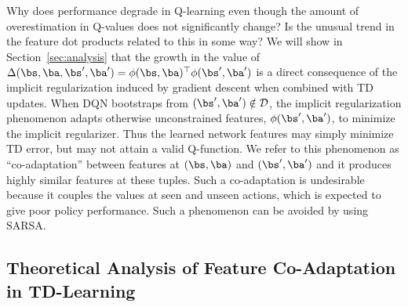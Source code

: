 Why does performance degrade in Q-learning even though the amount of overestimation in Q-values does not significantly change? Is the unusual trend in the feature dot products related to this in some way? We will show in Section~\ref{sec:analysis} that the growth in the value of $\Delta(\bs, \ba, \bs', \ba') = \phi(\bs, \ba)^\top \phi(\bs', \ba')$ is a direct consequence of the implicit regularization induced by gradient descent when combined with TD updates. When DQN bootstraps from $(\bs', \ba') \notin \mathcal{D}$, the implicit regularization phenomenon adapts otherwise unconstrained
features, $\phi(\bs', \ba')$, to minimize the implicit regularizer.
Thus the learned network features may simply minimize TD error, but may not attain a valid Q-function.
We refer to this phenomenon as ``co-adaptation'' between features at $(\bs, \ba)$ and $(\bs', \ba')$ and it produces highly similar features at these tuples. Such a co-adaptation is undesirable because it couples the values at seen and unseen actions, which is expected to give poor policy performance. Such a phenomenon can be avoided by using SARSA.  


\subsection{Theoretical Analysis of Feature Co-Adaptation in TD-Learning}

